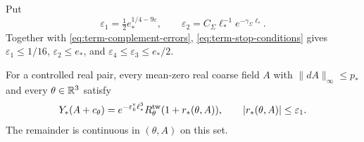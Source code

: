 Put
\begin{equation}\label{eq:term-remainder-errors}
 \varepsilon_1=\tfrac12e_*^{1/4-9\varepsilon},\qquad
 \varepsilon_2=C_\Sigma\ell_*^{-1}e^{-\gamma_\Sigma\ell_*}.
\end{equation}
Together with \eqref{eq:term-complement-errors},
\eqref{eq:term-stop-conditions} gives
$\varepsilon_1\le1/16$, $\varepsilon_2\le e_*$,
and $\varepsilon_4\le\varepsilon_3\le e_*/2$.

\begin{proposition}\label{prop:term-remainder}
For a controlled real pair, every mean-zero real coarse
field $A$ with $\|dA\|_\infty\le p_*$ and every
$\theta\in\mathbb R^3$ satisfy
\begin{equation}\label{eq:term-density-remainder}
 Y_*(A+c_\theta)
     =e^{-\varepsilon_k^{\rm v}\ell_*^3}
                R_\theta^{\rm tw}(1+r_*(\theta,A)),
                         \qquad |r_*(\theta,A)|\le\varepsilon_1.
\end{equation}
The remainder is continuous in $(\theta,A)$ on this set.
\end{proposition}

